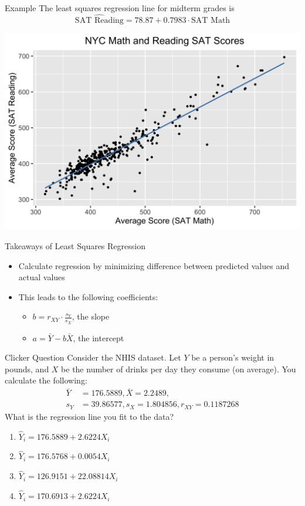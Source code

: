 \documentclass{beamer}
\begin{document}
\begin{frame}{Example}
	The least squares regression line for midterm grades is
	\[ \widehat{\text{SAT Reading}} = 78.87 + 0.7983 \cdot \text{SAT Math} \] 
	\begin{center}
		\includegraphics[width=.8\textwidth]{reg_line.png}
	\end{center}
\end{frame}

\begin{frame}{Takeaways of Least Squares Regression}
	
	\begin{itemize}
		\item Calculate regression by minimizing difference between predicted values and actual values
		      
		\item This leads to the following coefficients:
		      \begin{itemize}
		      	\item $b=r_{XY} \cdot \frac{s_Y}{s_X}$, the slope
		      	\item $a=\bar{Y}-b\bar{X}$, the intercept
		      \end{itemize}
	\end{itemize}
	
\end{frame}
	
\begin{frame}{Clicker Question}
	Consider the NHIS dataset. Let $Y$ be a person's weight in pounds, and $X$ be the number of drinks per day they consume (on average). You calculate the following:  
	\begin{align*} 
		\bar{Y} & =176.5889, \bar{X}=2.2489,                \\
		s_Y     & =39.86577, s_X=1.804856, r_{XY}=0.1187268 
	\end{align*}
	What is the regression line you fit to the data?
	\begin{enumerate}[label=(\alph*)]
		\item $\widehat{Y}_i=176.5889+2.6224X_i$
		\item $\widehat{Y}_i=176.5768+0.0054X_i$
		\item $\widehat{Y}_i=126.9151+22.08814X_i$
		\item {$\widehat{Y}_i=170.6913+2.6224X_i$} %
	\end{enumerate}
\end{frame}
	
\end{document}
